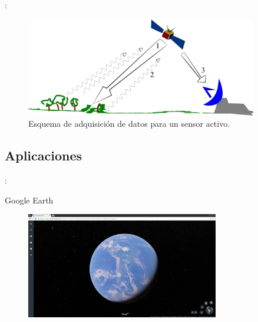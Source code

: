 \documentclass[handout,aspectratio=169]{beamer}
\begin{document}
\begin{frame}{\secname : \subsecname}
    \begin{figure}[h!]
        \centering
        \includegraphics[width=0.9\textwidth]{fig:activo.png}
        \caption{Esquema de adquisición de datos para un sensor activo. \cite{wiki:rs}}
        \label{fig:activo}
    \end{figure}
\end{frame}

\subsection{Aplicaciones}

\begin{frame}{\secname : \subsecname}
    \begin{exampleblock}{Google Earth}
        \begin{figure}[h!]
            \centering
            \includegraphics[width=0.75\textwidth]{fig:GE.png}
            \label{fig:GE}
        \end{figure}
    \end{exampleblock}
\end{frame}
\end{document}
